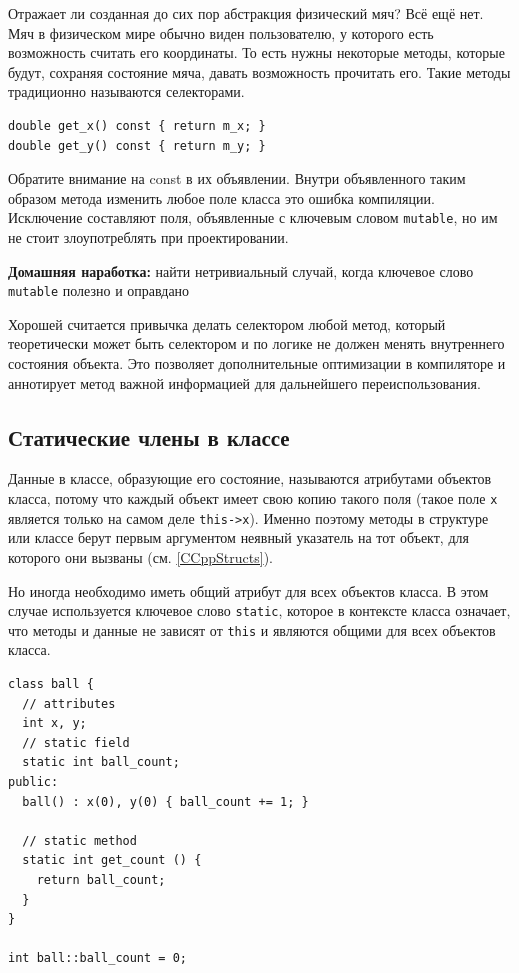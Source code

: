 \documentclass[a4paper,12pt,oneside]{book}
\begin{document}
Отражает ли созданная до сих пор абстракция физический мяч? Всё ещё нет. Мяч в физическом мире обычно виден пользователю, у которого есть возможность считать его координаты. То есть нужны некоторые методы, которые будут, сохраняя состояние мяча, давать возможность прочитать его. Такие методы традиционно называются селекторами.

\begin{lstlisting}
double get_x() const { return m_x; }
double get_y() const { return m_y; }
\end{lstlisting}

Обратите внимание на const в их объявлении. Внутри объявленного таким образом метода изменить любое поле класса это ошибка компиляции. Исключение составляют поля, объявленные с ключевым словом \lstinline!mutable!, но им не стоит злоупотреблять при проектировании.

\textbf{Домашняя наработка:} найти нетривиальный случай, когда ключевое слово \lstinline!mutable! полезно и оправдано

Хорошей считается привычка делать селектором любой метод, который теоретически может быть селектором и по логике не должен менять внутреннего состояния объекта. Это позволяет дополнительные оптимизации в компиляторе и аннотирует  метод важной информацией для дальнейшего переиспользования.

\subsection{Статические члены в классе}\label{StaticMembers}

Данные в классе, образующие его состояние, называются атрибутами объектов класса, потому что каждый объект имеет свою копию такого поля (такое поле \lstinline!x! является только на самом деле \lstinline!this->x!). Именно поэтому методы в структуре или классе берут первым аргументом неявный указатель на тот объект, для которого они вызваны (см. \ref{CCppStructs}).

Но иногда необходимо иметь общий атрибут для всех объектов класса. В этом случае используется ключевое слово \lstinline!static!, которое в контексте класса означает, что методы и данные не зависят от \lstinline!this! и являются общими для всех объектов класса.

\begin{lstlisting}
class ball {
  // attributes
  int x, y;
  // static field
  static int ball_count;
public: 
  ball() : x(0), y(0) { ball_count += 1; }

  // static method
  static int get_count () { 
    return ball_count; 
  }
}

int ball::ball_count = 0;
\end{lstlisting}
\end{document}
